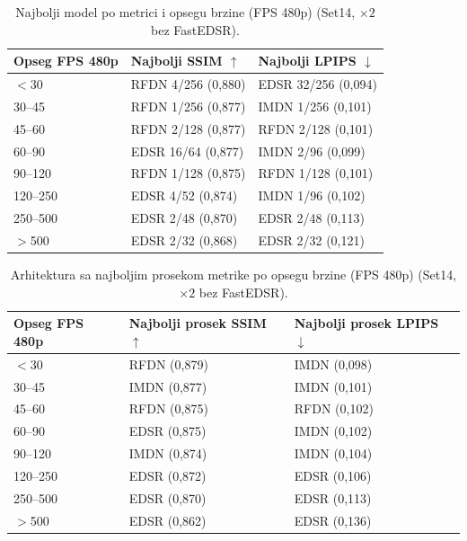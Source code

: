 
\begin{table}[H]
    \centering
    \caption{Najbolji model po metrici i opsegu brzine (FPS 480p) (Set14, $\times2$ bez FastEDSR).}
    \label{tab:fps_bins_best_model_2x_Set14}
    \small
    \setlength{\tabcolsep}{4pt}
    \begin{tabular}{@{}lll@{}}
        \toprule
        Opseg FPS 480p & Najbolji SSIM $\uparrow$ & Najbolji LPIPS $\downarrow$ \\
        \midrule
        $<$30 & RFDN 4/256 (0,880) & EDSR 32/256 (0,094) \\
        30--45 & RFDN 1/256 (0,877) & IMDN 1/256 (0,101) \\
        45--60 & RFDN 2/128 (0,877) & RFDN 2/128 (0,101) \\
        60--90 & EDSR 16/64 (0,877) & IMDN 2/96 (0,099) \\
        90--120 & RFDN 1/128 (0,875) & RFDN 1/128 (0,101) \\
        120--250 & EDSR 4/52 (0,874) & IMDN 1/96 (0,102) \\
        250--500 & EDSR 2/48 (0,870) & EDSR 2/48 (0,113) \\
        $>$500 & EDSR 2/32 (0,868) & EDSR 2/32 (0,121) \\
        \bottomrule
    \end{tabular}
\end{table}

\begin{table}[H]
    \centering
    \caption{Arhitektura sa najboljim prosekom metrike po opsegu brzine (FPS 480p) (Set14, $\times2$ bez FastEDSR).}
    \label{tab:fps_bins_best_arch_2x_Set14}
    \small
    \setlength{\tabcolsep}{4pt}
    \begin{tabular}{@{}lll@{}}
        \toprule
        Opseg FPS 480p & Najbolji prosek SSIM $\uparrow$ & Najbolji prosek LPIPS $\downarrow$ \\
        \midrule
        $<$30 & RFDN (0,879) & IMDN (0,098) \\
        30--45 & IMDN (0,877) & IMDN (0,101) \\
        45--60 & RFDN (0,875) & RFDN (0,102) \\
        60--90 & EDSR (0,875) & IMDN (0,102) \\
        90--120 & IMDN (0,874) & IMDN (0,104) \\
        120--250 & EDSR (0,872) & EDSR (0,106) \\
        250--500 & EDSR (0,870) & EDSR (0,113) \\
        $>$500 & EDSR (0,862) & EDSR (0,136) \\
        \bottomrule
    \end{tabular}
\end{table}

